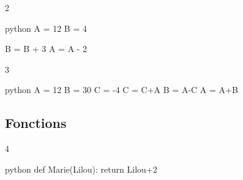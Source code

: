 \begin{frame}[fragile]{2\vspace{-32pt}}	
\begin{center}
\begin{minipage}{0.8\textwidth}
\begin{mintedbox}{python}
A = 12
B = 4

B = B + 3
A = A - 2
\end{mintedbox}
\end{minipage}
\end{center}

\end{frame}



\begin{frame}[fragile]{3\vspace{-32pt}}	
\vspace{-5pt}
\begin{center}
\begin{minipage}{0.8\textwidth}
\begin{mintedbox}{python}
A = 12
B = 30
C = -4
C = C+A
B = A-C
A = A+B
\end{mintedbox}
\end{minipage}
\end{center}

\end{frame}

\subsection{Fonctions}


\begin{frame}[fragile]{4\vspace{-32pt}}	
\begin{center}
\begin{minipage}{0.8\textwidth}
\begin{mintedbox}{python}
def Marie(Lilou):
	return Lilou+2
\end{mintedbox}
\end{minipage}
\end{center}

\end{frame}

